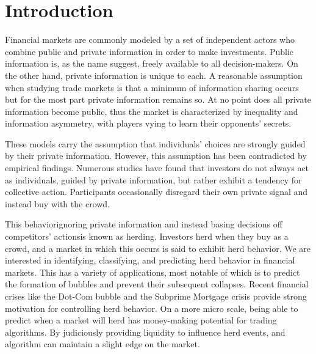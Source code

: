 \section{Introduction}
\label{introduction}
Financial markets are commonly modeled by a set of independent actors who combine public and private information in order to make investments.
Public information is, as the name suggest, freely available to all decision-makers.
On the other hand, private information is unique to each.
A reasonable assumption when studying trade markets is that a minimum of information sharing occurs but for the most part private information remains so.
At no point does all private information become public, thus the market is characterized by inequality and information asymmetry, with players vying to learn their opponents' secrets.

These models carry the assumption that individuals' choices are strongly guided by their private information.
However, this assumption has been contradicted by empirical findings. 
Numerous studies have found that investors do not always act as individuals, guided by private information, but rather exhibit a tendency for collective action.
Participants occasionally disregard their own private signal and instead buy with the crowd.

This behavior\textemdash ignoring private information and instead basing decisions off competitors' actions\textemdash is known as herding.
Investors herd when they buy as a crowd, and a market in which this occurs is said to exhibit herd behavior.
We are interested in identifying, classifying, and predicting herd behavior in financial markets.
This has a variety of applications, most notable of which is to predict the formation of bubbles and prevent their subsequent collapses. 
Recent financial crises like the Dot-Com bubble and the Subprime Mortgage crisis provide strong motivation for controlling herd behavior.
On a more micro scale, being able to predict when a market will herd has money-making potential for trading algorithms.
By judiciously providing liquidity to influence herd events, and algorithm can maintain a slight edge on the market.


